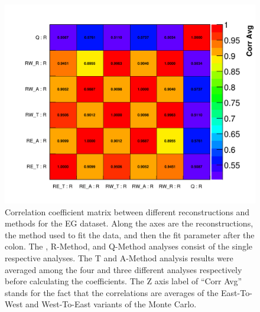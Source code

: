 \begin{figure}[]
\centering
\includegraphics[width=\textwidth]{Avg_Recon_CorrelationMatrix_R_R}
\caption{Correlation coefficient matrix between different reconstructions and methods for the EG dataset. Along the axes are the reconstructions, the method used to fit the data, and then the fit parameter after the colon. The \RE, R-Method, and Q-Method analyses consist of the single respective analyses. The \RW T and A-Method analysis results were averaged among the four and three different analyses respectively before calculating the coefficients. The Z axis label of ``Corr Avg'' stands for the fact that the correlations are averages of the East-To-West and West-To-East variants of the Monte Carlo.}
\label{fig:corrMatRecon}
\end{figure}





